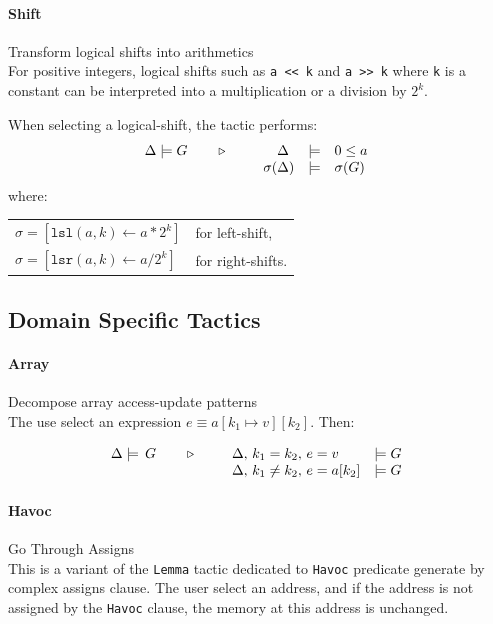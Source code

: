 \paragraph{Shift} Transform logical shifts into arithmetics\\
For positive integers, logical shifts such as \lstinline{a << k}
and \lstinline{a >> k} where \lstinline$k$ is a constant can be interpreted into a multiplication or a division by $2^k$.

When selecting a logical-shift, the tactic performs:
\[\TACTIC{\Delta\models G}{%
\begin{array}[t]{rcl}
\Delta\phantom{)} &\models& 0 \leq a \\
\sigma(\Delta) &\models& \sigma(G)
\end{array}
}\]
where:
\begin{tabular}[t]{ll}
$\sigma = [ \mathtt{lsl}(a,k) \leftarrow a * 2^k ]$ &
for left-shift, \\
$\sigma = [ \mathtt{lsr}(a,k) \leftarrow a / 2^k ]$ &
for right-shifts.
\end{tabular}

\subsection{Domain Specific Tactics}

\paragraph{Array} Decompose array access-update patterns\\
The use select an expression $e\equiv a[k_1\mapsto v][k_2]$. Then:

\[
\TACTIC{\Delta\models\,G}{%
\begin{array}[t]{ll}
\Delta,\,k_1=k_2,\,e = v &\models G \\
\Delta,\,k_1\neq k_2,\,e = a[k_2] &\models G
\end{array}
}\]

\paragraph{Havoc} Go Through Assigns \\
This is a variant of the \texttt{Lemma} tactic dedicated to \texttt{Havoc} predicate generate by complex assigns clause. The user select an address, and if the address is not assigned by the \texttt{Havoc} clause, the memory at this address is unchanged.

